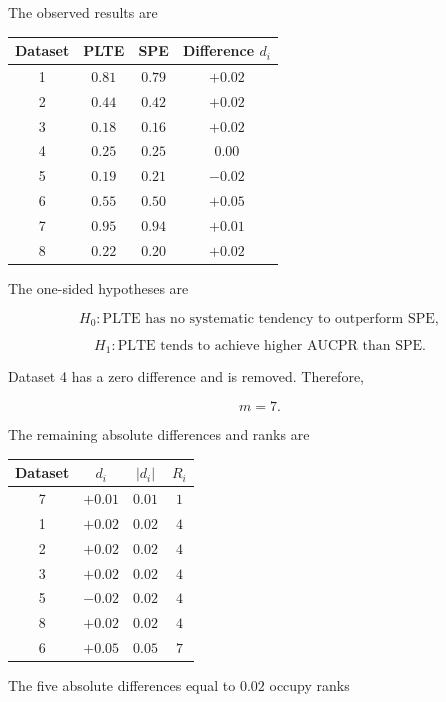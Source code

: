 \documentclass[11pt]{article}
\begin{document}
The observed results are

\begin{center}
\begin{tabular}{cccc}
\toprule
Dataset & PLTE & SPE & Difference \(d_i\) \\
\midrule
1 & \(0.81\) & \(0.79\) & \(+0.02\) \\
2 & \(0.44\) & \(0.42\) & \(+0.02\) \\
3 & \(0.18\) & \(0.16\) & \(+0.02\) \\
4 & \(0.25\) & \(0.25\) & \(0.00\) \\
5 & \(0.19\) & \(0.21\) & \(-0.02\) \\
6 & \(0.55\) & \(0.50\) & \(+0.05\) \\
7 & \(0.95\) & \(0.94\) & \(+0.01\) \\
8 & \(0.22\) & \(0.20\) & \(+0.02\) \\
\bottomrule
\end{tabular}
\end{center}

The one-sided hypotheses are

\[
H_0:
\text{PLTE has no systematic tendency to outperform SPE},
\]

\[
H_1:
\text{PLTE tends to achieve higher AUCPR than SPE}.
\]

Dataset 4 has a zero difference and is removed. Therefore,

\[
m=7.
\]

The remaining absolute differences and ranks are

\begin{center}
\begin{tabular}{cccc}
\toprule
Dataset & \(d_i\) & \(|d_i|\) & \(R_i\) \\
\midrule
7 & \(+0.01\) & \(0.01\) & \(1\) \\
1 & \(+0.02\) & \(0.02\) & \(4\) \\
2 & \(+0.02\) & \(0.02\) & \(4\) \\
3 & \(+0.02\) & \(0.02\) & \(4\) \\
5 & \(-0.02\) & \(0.02\) & \(4\) \\
8 & \(+0.02\) & \(0.02\) & \(4\) \\
6 & \(+0.05\) & \(0.05\) & \(7\) \\
\bottomrule
\end{tabular}
\end{center}

The five absolute differences equal to \(0.02\) occupy ranks
\end{document}

